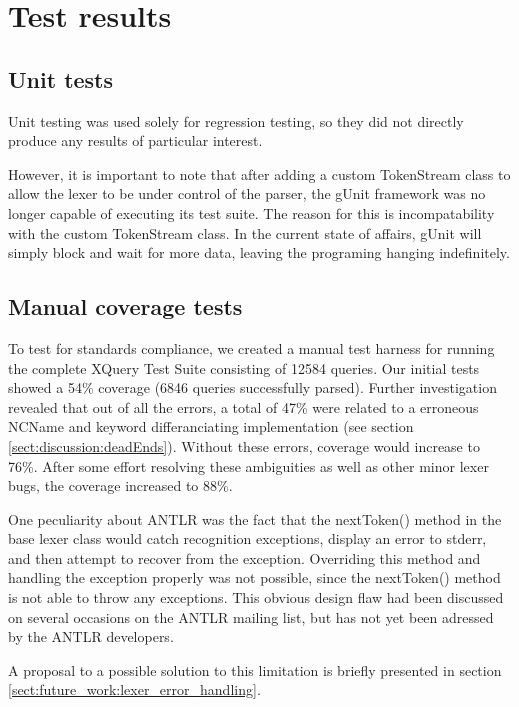 \section{Test results}
\subsection{Unit tests}
Unit testing was used solely for regression testing, so they did not directly 
produce any results of particular interest.

However, it is important to note that after adding a custom TokenStream class to
allow the lexer to be under control of the parser, the gUnit framework was no
longer capable of executing its test suite. The reason for this is
incompatability with the custom TokenStream class. In the current state of
affairs, gUnit will simply block and wait for more data, leaving the programing
hanging indefinitely. 

\subsection{Manual coverage tests}
\label{sect:tests:manual}
To test for standards compliance, we created a manual test harness for running
the complete XQuery Test Suite\cite{w3c05} consisting of 12584 queries. Our
initial tests showed a 54\% coverage (6846 queries successfully parsed). Further
investigation revealed that out of all the errors, a total of 47\% were related
to a erroneous NCName and keyword differanciating implementation (see section \ref{sect:discussion:deadEnds}). Without these errors, coverage would increase to 76\%. After some effort resolving these ambiguities as well as other minor lexer
bugs, the coverage increased to 88\%.

One peculiarity about ANTLR was the fact that the nextToken() method in the base
lexer class would catch recognition exceptions, display an error to stderr, and
then attempt to recover from the exception. Overriding this method and handling
the exception properly was not possible, since the nextToken() method is not
able to throw any exceptions. This obvious design flaw had been discussed on
several occasions on the ANTLR mailing list\cite{antlrmail}, but has not yet
been adressed by the ANTLR developers.

A proposal to a possible solution to this limitation is briefly presented in
section \ref{sect:future_work:lexer_error_handling}.